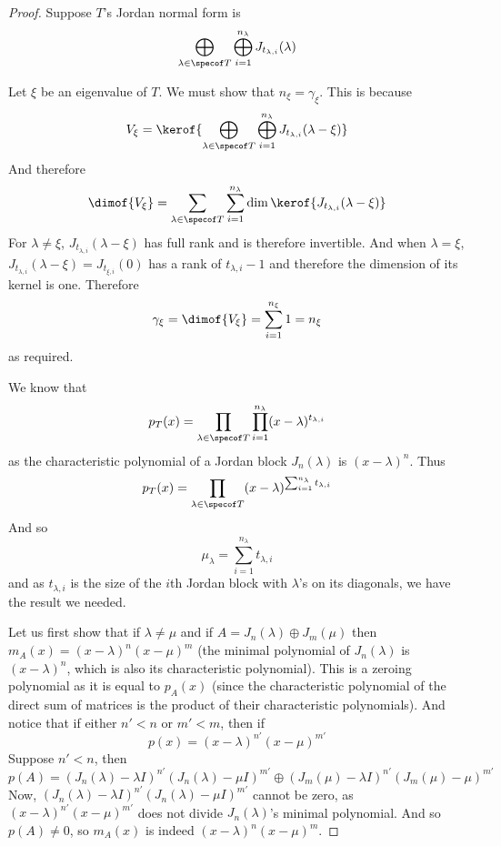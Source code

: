 \begin{proof}

    Suppose $T$'s Jordan normal form is
    \[ \bigoplus_{\lambda\in\specof T}\bigoplus_{i=1}^{n_\lambda}J_{t_{\lambda,i}}(\lambda) \]

    \benum
        \item Let $\xi$ be an eigenvalue of $T$.
        We must show that $n_\xi=\gamma_\xi$.
        This is because
        \[ V_\xi = \kerof{\bigoplus_{\lambda\in\specof T}\bigoplus_{i=1}^{n_\lambda}J_{t_{\lambda,i}}(\lambda-\xi)} \]
        And therefore
        \[ \dimof{V_\xi} = \sum_{\lambda\in\specof T}\sum_{i=1}^{n_\lambda}\dim\kerof{J_{t_{\lambda,i}}(\lambda-\xi)} \]
        For $\lambda\neq\xi$, $J_{t_{\lambda,i}}(\lambda-\xi)$ has full rank and is therefore invertible.
        And when $\lambda=\xi$, $J_{t_{\lambda,i}}(\lambda-\xi)=J_{t_{\xi,i}}(0)$ has a rank of $t_{\lambda,i}-1$ and therefore the dimension of its kernel is one.
        Therefore
        \[ \gamma_\xi = \dimof{V_\xi} = \sum_{i=1}^{n_\xi}1 = n_\xi \]
        as required.

        \item We know that
        \[ p_T(x) = \prod_{\lambda\in\specof T}\prod_{i=1}^{n_\lambda}(x-\lambda)^{t_{\lambda,i}} \]
        as the characteristic polynomial of a Jordan block $J_n(\lambda)$ is $(x-\lambda)^n$.
        Thus
        \[ p_T(x) = \prod_{\lambda\in\specof T}(x-\lambda)^{\sum_{i=1}^{n_\lambda}t_{\lambda,i}} \]
        And so
        \[ \mu_\lambda = \sum_{i=1}^{n_\lambda}t_{\lambda,i} \]
        and as $t_{\lambda,i}$ is the size of the $i$th Jordan block with $\lambda$'s on its diagonals, we have the result we needed.

        \item Let us first show that if $\lambda\neq\mu$ and if $A=J_n(\lambda)\oplus J_m(\mu)$ then $m_A(x)=(x-\lambda)^n(x-\mu)^m$ (the minimal polynomial of $J_n(\lambda)$ is $(x-\lambda)^n$, which is
        also its characteristic polynomial).
        This is a zeroing polynomial as it is equal to $p_A(x)$ (since the characteristic polynomial of the direct sum of matrices is the product of their characteristic polynomials).
        And notice that if either $n'<n$ or $m'<m$, then if
        \[ p(x) = (x-\lambda)^{n'}(x-\mu)^{m'} \]
        Suppose $n'<n$, then
        \[ p(A) = (J_n(\lambda)-\lambda I)^{n'}(J_n(\lambda)-\mu I)^{m'}\oplus(J_m(\mu)-\lambda I)^{n'}(J_m(\mu)-\mu)^{m'} \]
        Now, $(J_n(\lambda)-\lambda I)^{n'}(J_n(\lambda)-\mu I)^{m'}$ cannot be zero, as $(x-\lambda)^{n'}(x-\mu)^{m'}$ does not divide $J_n(\lambda)$'s minimal polynomial.
        And so $p(A)\neq0$, so $m_A(x)$ is indeed $(x-\lambda)^n(x-\mu)^m$.


\end{proof}
